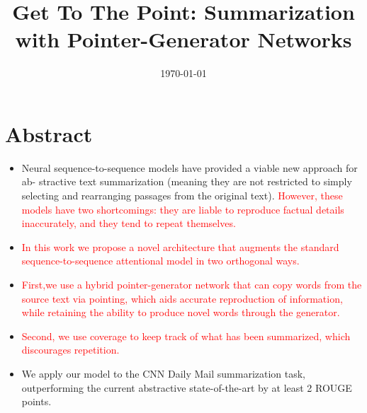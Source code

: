 \documentclass[UTF8]{ctexart}
\title{Get To The Point: Summarization with Pointer-Generator Networks}
\date{\today}
\begin{document}
    \maketitle
    \section{Abstract}
    \begin{itemize}
    \item  Neural sequence-to-sequence models have provided a viable new approach for ab-
    stractive text summarization (meaning they are not restricted to simply selecting
    and rearranging passages from the original text). \textcolor{red}{However, these models have two
    shortcomings: they are liable to reproduce factual details inaccurately, and they tend
    to repeat themselves.  }
    \item \textcolor{red}{In this work we propose a novel architecture that augments the
    standard sequence-to-sequence attentional model in two orthogonal ways. }
    \item \textcolor{red}{First,we use a hybrid pointer-generator network that can copy words from the source text
    via pointing, which aids accurate reproduction of information, while retaining the
    ability to produce novel words through the generator.} 
    \item \textcolor{red}{Second, we use coverage to keep track of what has been summarized,
    which discourages repetition.}
    \item We apply our model to the CNN \/ Daily Mail summarization task, outperforming the current
    abstractive state-of-the-art by at least 2 ROUGE points.
    \end{itemize}
\end{document}
